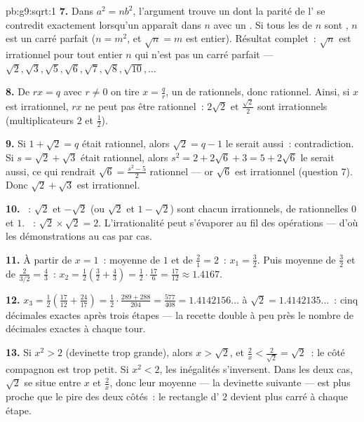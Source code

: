 \begin{solution}{pb:g9:sqrt:1}
\textbf{7.} Dans $a^2 = n b^2$, l'argument trouve un 
dont la parité de l' se contredit exactement lorsqu'un
 apparaît dans $n$ avec un  \emph{}. Si
tous les  de $n$ sont , $n$ est un carré parfait
($n = m^2$, et $\sqrt n = m$ est entier). Résultat complet~:
$\sqrt n$ est irrationnel pour tout entier $n$ qui n'est pas un
carré parfait --- $\sqrt2, \sqrt3, \sqrt5, \sqrt6, \sqrt7, \sqrt8,
\sqrt{10}, \dots$

\textbf{8.} De $r x = q$ avec $r \neq 0$ on tire
$x = \frac qr$, un  de rationnels, donc rationnel. Ainsi, si
$x$ est irrationnel, $r x$ ne peut pas être rationnel~: $2\sqrt2$ et
$\frac{\sqrt2}{2}$ sont irrationnels (multiplicateurs $2$ et
$\frac12$).

\textbf{9.} Si $1 + \sqrt2 = q$ était rationnel, alors
$\sqrt2 = q - 1$ le serait aussi~: contradiction. Si
$s = \sqrt2 + \sqrt3$ était rationnel, alors
$s^2 = 2 + 2\sqrt6 + 3 = 5 + 2\sqrt6$ le serait aussi, ce qui
rendrait $\sqrt6 = \frac{s^2 - 5}{2}$ rationnel --- or $\sqrt6$ est
irrationnel (question 7). Donc $\sqrt2 + \sqrt3$ est irrationnel.

\textbf{10.} ~: $\sqrt2$ et $-\sqrt2$ (ou $\sqrt2$ et
$1 - \sqrt2$) sont chacun irrationnels, de  rationnelles $0$
et $1$. ~: $\sqrt2 \times \sqrt2 = 2$. L'irrationalité peut
s'évaporer au fil des opérations --- d'où les démonstrations au cas
par cas.

\textbf{11.} À partir de $x = 1$~: moyenne de $1$ et de
$\frac21 = 2$~: $x_1 = \frac32$. Puis moyenne de $\frac32$ et de
$\frac{2}{3/2} = \frac43$~:
$x_2 = \frac12\left(\frac32 + \frac43\right)
= \frac12 \cdot \frac{17}{6} = \frac{17}{12} \approx 1.4167$.

\textbf{12.} $x_3 = \frac12\left(\frac{17}{12} +
\frac{24}{17}\right) = \frac12 \cdot
\frac{289 + 288}{204} = \frac{577}{408} = 1.4142156\ldots$  à
$\sqrt2 = 1.4142135\ldots$~: cinq décimales exactes après trois
étapes --- la recette double à peu près le nombre de décimales
exactes à chaque tour.

\textbf{13.} Si $x^2 > 2$ (devinette trop grande), alors
$x > \sqrt2$, et $\frac2x < \frac{2}{\sqrt2} = \sqrt2$~: le côté
compagnon est trop petit. Si $x^2 < 2$, les inégalités s'inversent.
Dans les deux cas, $\sqrt2$ se situe entre $x$ et $\frac2x$, donc
leur moyenne --- la devinette suivante --- est plus proche que le
pire des deux côtés~: le rectangle d' $2$ devient plus carré à
chaque étape.


\end{solution}
